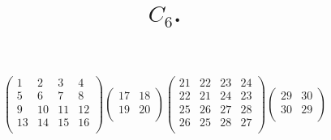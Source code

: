 \documentclass[12pt,a4paper]{amsart}
\title{$C_6$.}
\begin{document}
\maketitle

\begin{align*}
  \left(
  \begin{array}{c|c|c|c}
    1&2&3&4\\
\hline
    5&6&7&8\\
\hline
    9&10&11&12\\
\hline
    13&14&15&16\\
  \end{array}
\right)
  \left(
  \begin{array}{c|c}
    17&18\\
\hline
    19&20\\
  \end{array}
\right)
  \left(
  \begin{array}{cc|cc}
    21&22&23&24\\
    22&21&24&23\\
\hline
    25&26&27&28\\
    26&25&28&27\\
  \end{array}
\right)
  \left(
  \begin{array}{cc}
    29&30\\
    30&29\\
  \end{array}
\right)
\end{align*}
\end{document}

